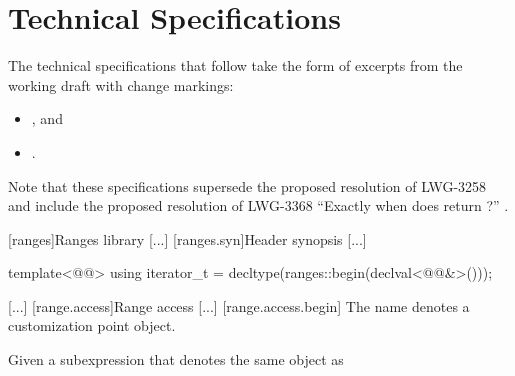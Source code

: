 \chapter{Technical Specifications}
The technical specifications that follow take the form of excerpts
from the working draft with change markings:
\begin{itemize}
\item {}, and
\item {}.
\end{itemize}

Note that these specifications supersede the proposed resolution of LWG-3258
and include the proposed resolution of
LWG-3368 ``Exactly when does  return ?'' \cite{lwg3368}.

\setcounter{chapter}{23}
[ranges]{Ranges library}
[...]
\setcounter{section}{1}
[ranges.syn]{Header  synopsis}
[...]
\begin{codeblock}
  template<@@>
    using iterator_t = decltype(ranges::begin(declval<@@&>()));
\end{codeblock}
[...]
[range.access]{Range access}
[...]
[range.access.begin]{}
\pnum
The name  denotes a customization point
object.

\pnum
Given a subexpression  
  that denotes the same object as \removed{,}

